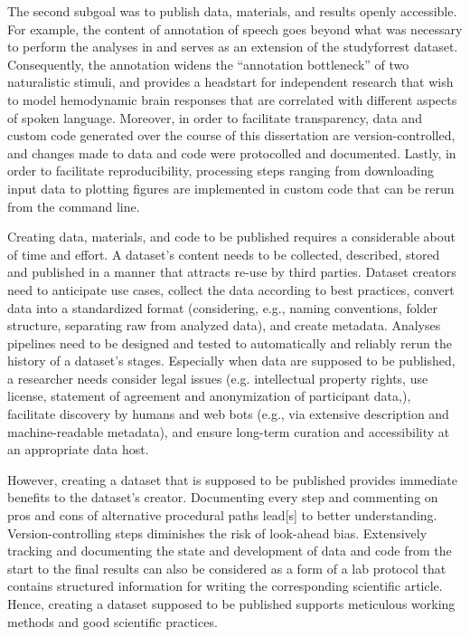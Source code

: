 %
The second subgoal was to publish data, materials, and results openly
accessible.
%
For example, the content of annotation of speech \citep{haeusler2021speechanno}
goes beyond what was necessary to perform the analyses in
\citet{haeusler2022processing} and serves as an extension of the studyforrest
dataset.
%
Consequently, the annotation widens the ``annotation bottleneck''
\citep{aliko2020naturalistic} of two naturalistic stimuli, and provides a
headstart for independent research that wish to model hemodynamic brain
responses that are correlated with different aspects of spoken language.
%
Moreover, in order to facilitate transparency, data and custom code generated
over the course of this dissertation are version-controlled, and changes made to
data and code were protocolled and documented.
%
Lastly, in order to facilitate reproducibility, processing steps ranging from
downloading input data to plotting figures are implemented in custom code that
can be rerun from the command line.

Creating data, materials, and code to be published requires a considerable about
of time and effort.
%
A dataset's content needs to be collected, described, stored and published in a
manner that attracts re-use by third parties.
%
Dataset creators need to anticipate use cases, collect the data according to
best practices, convert data into a standardized format (considering, e.g.,
naming conventions, folder structure, separating raw from analyzed data), and
create metadata.
%
Analyses pipelines need to be designed and tested to automatically and
reliably rerun the history of a dataset's stages.
%
Especially when data are supposed to be published, a researcher needs consider
legal issues (e.g. intellectual property rights, use license, statement of
agreement and anonymization of participant data,), facilitate discovery by
humans and web bots (e.g., via extensive description and machine-readable
metadata), and ensure long-term curation and accessibility at an appropriate
data host.

However, creating a dataset that is supposed to be published provides immediate
benefits to the dataset's creator.
%
Documenting every step and commenting on pros and cons of alternative procedural
paths lead[s] to better understanding.
%
Version-controlling steps diminishes the risk of look-ahead bias.
%
Extensively tracking and documenting the state and development of data and code
from the start to the final results can also be considered as a form of a lab
protocol that contains structured information for writing the corresponding
scientific article.
%
Hence, creating a dataset supposed to be published supports meticulous working
methods and good scientific practices.


